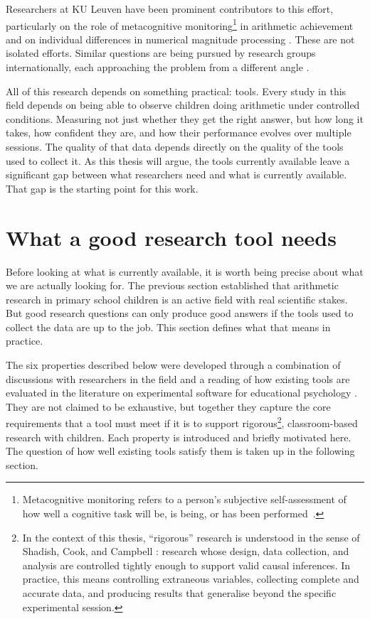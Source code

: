 Researchers at KU Leuven have been prominent contributors to this effort, particularly on the role of metacognitive monitoring\footnote{Metacognitive monitoring refers to a person's subjective self-assessment of how well a cognitive task will be, is being, or has been performed~\cite{bellon2020}.} in arithmetic achievement \cite{bellon_more_2019, bellon2020, bellon2021} and on individual differences in numerical magnitude processing \cite{vanbinst_chapter_2016}. These are not isolated efforts. Similar questions are being pursued by research groups internationally, each approaching the problem from a different angle \cite{geary_chapter_2016, ansari2025arithmetic, zhang2022working, hickendorff2022flexibility}.

All of this research depends on something practical: tools. Every study in this field depends on being able to observe children doing arithmetic under controlled conditions. Measuring not just whether they get the right answer, but how long it takes, how confident they are, and how their performance evolves over multiple sessions. The quality of that data depends directly on the quality of the tools used to collect it. As this thesis will argue, the tools currently available leave a significant gap between what researchers need and what is currently available. That gap is the starting point for this work.


\section{What a good research tool needs}
\label{sec:research-properties}
Before looking at what is currently available, it is worth being precise about what we are actually looking for. The previous section established that arithmetic research in primary school children is an active field with real scientific stakes. But good research questions can only produce good answers if the tools used to collect the data are up to the job. This section defines what that means in practice.

The six properties described below were developed through a combination of discussions with researchers in the field and a reading of how existing tools are evaluated in the literature on experimental software for educational psychology \cite{peirce_psychopypsychophysics_2007,mathot_opensesame_2012}. They are not claimed to be exhaustive, but together they capture the core requirements that a tool must meet if it is to support rigorous\footnote{In the context of this thesis, ``rigorous'' research is understood in the sense of Shadish, Cook, and Campbell \cite{shadish2002experimental}: research whose design, data collection, and analysis are controlled tightly enough to support valid causal inferences. In practice, this means controlling extraneous variables, collecting complete and accurate data, and producing results that generalise beyond the specific experimental session.}, classroom-based research with children. Each property is introduced and briefly motivated here. The question of how well existing tools satisfy them is taken up in the following section.

